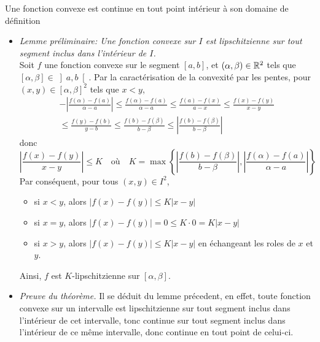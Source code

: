 \documentclass{article}
\begin{document}
\begin{question_kholle}{Une fonction convexe est continue en tout point intérieur à son domaine de définition}
	\hfill\\
	\begin{itemize}[label=$\vartriangleright$]
		\item \textit{Lemme préliminaire: Une fonction convexe sur $I$ est lipschitzienne sur tout segment inclus dans l’intérieur de $I$.}\\
		      Soit $f$ une fonction convexe sur le segment $[a,b]$, et $(\alpha, \beta)\in\mathbb R^{2}$ tels que $[\alpha, \beta]\in\left]a,b\right[$.
		      Par la caractérisation de la convexité par les pentes, pour $(x,y)\in[\alpha, \beta]^{2}$ tels que $x<y$,
		      \begin{multline*}
			      -\left|\frac{f(\alpha)-f(a)}{\alpha-a}\right| \leq \frac{f(\alpha)-f(a)}{\alpha-a} \leq \frac{f(a)-f(x)}{a-x} \leq \frac{f(x)-f(y)}{x-y}\\ \leq \frac{f(y)-f(b)}{y-b} \leq \frac{f(b)-f(\beta)}{b-\beta} \leq \left|\frac{f(b)-f(\beta)}{b-\beta}\right|
		      \end{multline*}
		      donc
		      \[
			      \left|\frac{f(x)-f(y)}{x-y}\right| \leq K \quad\text{où}\quad K=\max \left\{\left|\frac{f(b)-f(\beta)}{b-\beta}\right|, \left|\frac{f(\alpha)-f(a)}{\alpha-a}\right|\right\}
		      \]
		      Par conséquent, pour tous $(x,y)\in I^{2}$,
		      \begin{itemize}
			      \item si $x<y$, alors $|f(x)-f(y)|\leq K |x-y|$
			      \item si $x=y$, alors $|f(x)-f(y)|=0 \leq K\cdot 0 = K |x-y|$
			      \item si $x>y$, alors $|f(x)-f(y)| \leq K|x-y|$ en échangeant les roles de $x$ et $y$.
		      \end{itemize}
		      Ainsi, $f$ est $K$-lipschitzienne sur $[\alpha, \beta]$.

		\item \textit{Preuve du théorème.} Il se déduit du lemme précedent, en effet, toute fonction convexe sur un intervalle est lipschitzienne sur tout segment inclus dans l’intérieur de cet intervalle, tonc continue sur tout segment inclus dans l’intérieur de ce même intervalle, donc continue en tout point de celui-ci.
	\end{itemize}
\end{question_kholle}
\end{document}
